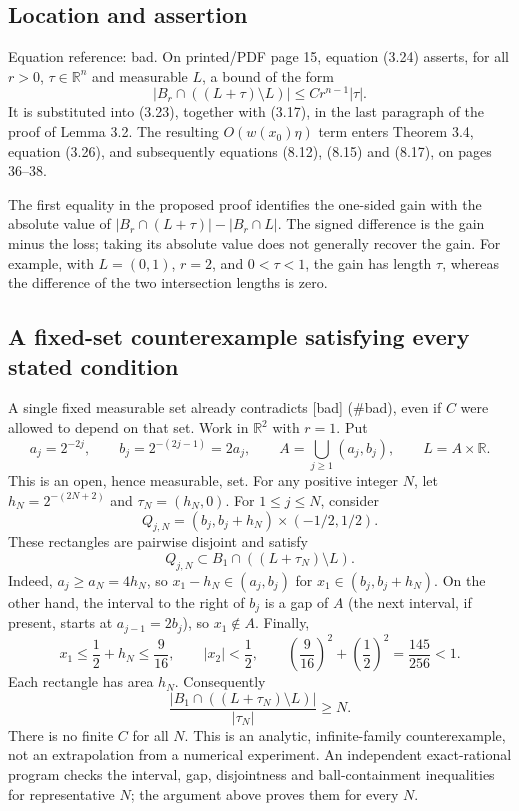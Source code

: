 \documentclass[10pt]{article}
\begin{document}
\subsection*{Location and assertion}
Equation reference: bad. On printed/PDF page 15, equation (3.24) asserts, for all \(r>0\), \(\tau\in\mathbb R^n\) and measurable \(L\), a bound of the form \[
 |B_r\cap((L+\tau)\setminus L)|\leq C r^{n-1}|\tau|.\] It is substituted into (3.23), together with (3.17), in the last paragraph of the proof of Lemma 3.2. The resulting \(O(w(x_0)\eta)\) term enters Theorem 3.4, equation (3.26), and subsequently equations (8.12), (8.15) and (8.17), on pages 36–38.\par
The first equality in the proposed proof identifies the one-sided gain with the absolute value of \(|B_r\cap(L+\tau)|-|B_r\cap L|\). The signed difference is the gain minus the loss; taking its absolute value does not generally recover the gain. For example, with \(L=(0,1)\), \(r=2\), and \(0<\tau<1\), the gain has length \(\tau\), whereas the difference of the two intersection lengths is zero.\par
\subsection*{A fixed-set counterexample satisfying every stated condition}
A single fixed measurable set already contradicts [bad] (\#bad), even if \(C\) were allowed to depend on that set. Work in \(\mathbb R^2\) with \(r=1\). Put \[a_j=2^{-2j},\qquad b_j=2^{-(2j-1)}=2a_j,\qquad
 A=\bigcup_{j\geq1}(a_j,b_j),\qquad L=A\times\mathbb R.\] This is an open, hence measurable, set. For any positive integer \(N\), let \(h_N=2^{-(2N+2)}\) and \(\tau_N=(h_N,0)\). For \(1\leq j\leq N\), consider \[Q_{j,N}=(b_j,b_j+h_N)\times(-1/2,1/2).\] These rectangles are pairwise disjoint and satisfy \[Q_{j,N}\subset B_1\cap((L+\tau_N)\setminus L).\] Indeed, \(a_j\geq a_N=4h_N\), so \(x_1-h_N\in(a_j,b_j)\) for \(x_1\in(b_j,b_j+h_N)\). On the other hand, the interval to the right of \(b_j\) is a gap of \(A\) (the next interval, if present, starts at \(a_{j-1}=2b_j\)), so \(x_1\notin A\). Finally, \[x_1\leq \frac12+h_N\leq\frac9{16},\qquad |x_2|<\frac12,\qquad
 \left(\frac9{16}\right)^2+\left(\frac12\right)^2
 =\frac{145}{256}<1 .\] Each rectangle has area \(h_N\). Consequently \[\frac{|B_1\cap((L+\tau_N)\setminus L)|}{|\tau_N|}
 \geq N .\] There is no finite \(C\) for all \(N\). This is an analytic, infinite-family counterexample, not an extrapolation from a numerical experiment. An independent exact-rational program checks the interval, gap, disjointness and ball-containment inequalities for representative \(N\); the argument above proves them for every \(N\).\par
\end{document}
